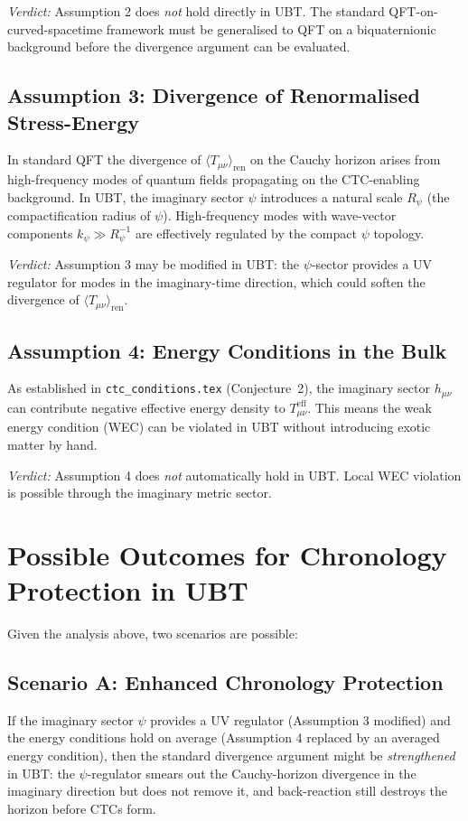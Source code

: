 \documentclass[12pt]{article}
\begin{document}
\textit{Verdict:} Assumption 2 does \emph{not} hold directly in UBT.
The standard QFT-on-curved-spacetime framework must be generalised to
QFT on a biquaternionic background before the divergence argument
can be evaluated.

\subsection{Assumption 3: Divergence of Renormalised Stress-Energy}
In standard QFT the divergence of $\langle T_{\mu\nu}\rangle_{\mathrm{ren}}$
on the Cauchy horizon arises from high-frequency modes of quantum fields
propagating on the CTC-enabling background.  In UBT, the imaginary
sector $\psi$ introduces a natural scale $R_\psi$ (the compactification
radius of $\psi$).  High-frequency modes with wave-vector components
$k_\psi \gg R_\psi^{-1}$ are effectively regulated by the compact $\psi$
topology.

\textit{Verdict:} Assumption 3 may be modified in UBT: the $\psi$-sector
provides a UV regulator for modes in the imaginary-time direction, which
could soften the divergence of $\langle T_{\mu\nu}\rangle_{\mathrm{ren}}$.

\subsection{Assumption 4: Energy Conditions in the Bulk}
As established in \texttt{ctc\_conditions.tex}
(Conjecture~2), the imaginary sector $h_{\mu\nu}$ can contribute
negative effective energy density to $T_{\mu\nu}^{\mathrm{eff}}$.  This
means the weak energy condition (WEC) can be violated in UBT without
introducing exotic matter by hand.

\textit{Verdict:} Assumption 4 does \emph{not} automatically hold in UBT.
Local WEC violation is possible through the imaginary metric sector.

\section{Possible Outcomes for Chronology Protection in UBT}
Given the analysis above, two scenarios are possible:

\subsection{Scenario A: Enhanced Chronology Protection}
If the imaginary sector $\psi$ provides a UV regulator (Assumption 3
modified) and the energy conditions hold on average (Assumption 4
replaced by an averaged energy condition), then the standard divergence
argument might be \emph{strengthened} in UBT: the $\psi$-regulator
smears out the Cauchy-horizon divergence in the imaginary direction but
does not remove it, and back-reaction still destroys the horizon before
CTCs form.
\end{document}
